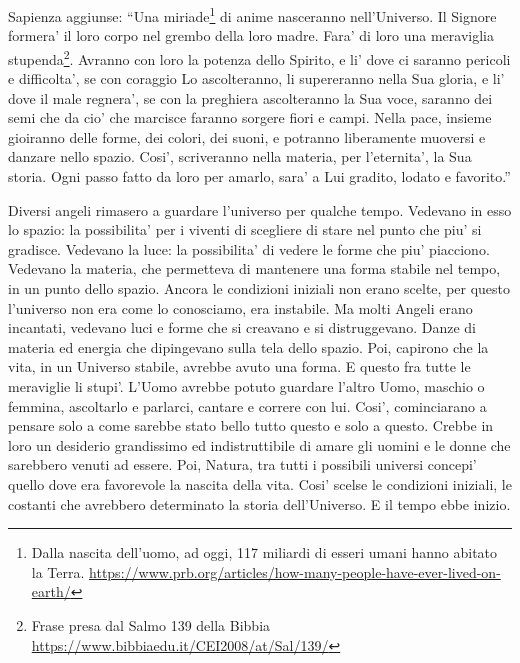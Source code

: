 {  Sapienza aggiunse:
\enquote{Una miriade\footnote{Dalla nascita dell'uomo, ad oggi, 117 miliardi di esseri umani hanno abitato la Terra. \url{https://www.prb.org/articles/how-many-people-have-ever-lived-on-earth/}} di anime nasceranno nell'Universo. 
Il Signore formera' il loro corpo nel grembo della loro madre. Fara' di loro una meraviglia stupenda\footnote{Frase presa dal Salmo 139 della Bibbia \url{https://www.bibbiaedu.it/CEI2008/at/Sal/139/}}.
Avranno con loro la potenza dello Spirito, e li' dove ci saranno pericoli e difficolta', se con coraggio Lo ascolteranno, li supereranno nella Sua gloria, e li' dove il male regnera', se con la preghiera ascolteranno la Sua voce, saranno dei semi che da cio' che marcisce faranno sorgere fiori e campi. 
Nella pace, insieme gioiranno delle forme, dei colori, dei suoni, e potranno liberamente muoversi e danzare nello spazio.  
Cosi', scriveranno nella materia, per l'eternita', la Sua storia. Ogni passo fatto da loro per amarlo, sara' a Lui gradito, lodato e favorito.}

Diversi angeli rimasero a guardare l'universo per qualche tempo. 
Vedevano in esso lo spazio: la possibilita' per i viventi di scegliere di stare nel punto che piu' si gradisce. Vedevano la luce: la possibilita' di vedere le forme che piu' piacciono. Vedevano la materia, che permetteva di mantenere una forma stabile nel tempo, in un punto dello spazio.
  Ancora le condizioni iniziali non erano scelte, per questo l'universo non era come lo conosciamo, era instabile. Ma molti Angeli erano incantati, vedevano luci e forme che si creavano e si distruggevano. Danze di materia ed energia che dipingevano sulla tela dello spazio. Poi, capirono che la vita, in un Universo stabile, avrebbe avuto una forma. E questo fra tutte le meraviglie li stupi'. L'Uomo avrebbe potuto guardare l'altro Uomo, maschio o femmina, ascoltarlo e parlarci, cantare e correre con lui.
Cosi', cominciarano a pensare solo a come sarebbe stato bello tutto questo e solo a questo. Crebbe in loro un desiderio grandissimo ed indistruttibile di amare gli uomini e le donne che sarebbero venuti ad essere.
Poi, Natura, tra tutti i possibili universi concepi' quello dove era favorevole la nascita della vita. Cosi' scelse le condizioni iniziali, le costanti che avrebbero determinato la storia dell'Universo. E il tempo ebbe inizio.

}
